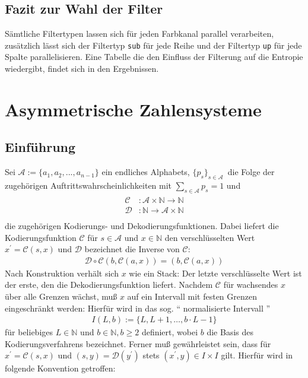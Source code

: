 \documentclass[a4paper,12pt]{article}
\newcommand{\N}{\mathbb N}
\newcommand{\A}{\mathcal A}
\newcommand{\C}{\mathcal C}
\newcommand{\D}{\mathcal D}
\begin{document}
\subsection{Fazit zur Wahl der Filter}
Sämtliche Filtertypen lassen sich für jeden Farbkanal parallel verarbeiten, zusätzlich lässt sich der Filtertyp {\tt{sub}} für jede Reihe und der Filtertyp {\tt{up}} für jede Spalte parallelisieren. Eine Tabelle die den Einfluss der Filterung auf die Entropie wiedergibt, findet sich in den Ergebnissen.
\newpage
\section{Asymmetrische Zahlensysteme}\label{ANS}
\subsection{Einführung}
Sei $\A:=\{a_{1},a_{2},...,a_{n-1}\}$  ein endliches Alphabets, $\{p_{s}\}_{s\in \A}\, $ die Folge der zugehörigen Auftrittswahrscheinlichkeiten mit
$\sum_{s\in \A} p_{s} =1$ und
\begin{align*}
             \begin{array} {ccc}
              \C &:\A \times \N  \rightarrow  \N \\
             \D &: \N\rightarrow\A \times \N\\
              \end{array}
\end{align*}
die zugehörigen Kodierungs- und Dekodierungsfunktionen. Dabei liefert die Kodierungsfunktion $ \C$ für $s\in\A$ und $x\in \N$  den verschlüsselten Wert $x^{'} = \mathcal C(s,x)$ und $\D$ bezeichnet die Inverse von $\C$:
\begin{align*}
\D \circ \C  \left( b, \C(a,x)\right)  = (b, \C(a,x))
\end{align*}
Nach Konstruktion verhält sich $x$ wie ein Stack: Der letzte verschlüsselte Wert ist der erste, den die Dekodierungsfunktion liefert. Nachdem $\C$ für wachsendes $x$ über alle Grenzen wächst, muß $x$ auf ein Intervall mit festen Grenzen eingeschränkt werden: Hierfür wird in \cite{Duda} das sog. "` normalisierte Intervall "' 
\begin{align*}
I(L,b):=\{L,L+1,\ldots,b\cdot L-1\}
\end{align*}
für beliebiges $L \in \N$ und $b\in \N, b\geq 2$ definiert, wobei $b$ die Basis des Kodierungsverfahrens bezeichnet. Ferner muß gewährleistet sein, dass für $x^{'} = \C(s,x)$  und $(s,y) = \D(y^{'})$ stets $(x^{'}, y) \in I\times I$ gilt. Hierfür wird in \cite{Krajcevski} folgende Konvention getroffen:
\end{document}
